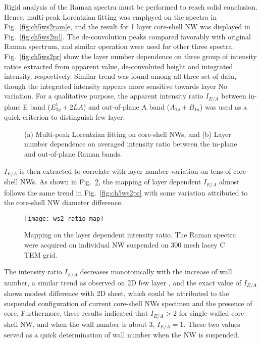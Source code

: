 Rigid analysis of the Raman spectra must be performed to reach solid conclusion. Hence, multi-peak Lorentzian fitting was emplpyed on the spectra in Fig.~\ref{fig:ch5ws2ram}e, and the result for 1 layer  core-shell NW was displayed in Fig.~\ref{fig:ch5ws2ml}. The de-convolution peaks compared favorably with original Raman spectrum, and similar operation were used for other three spectra. Fig.~\ref{fig:ch5ws2pr} show the layer number dependence on three group of intensity ratios extracted from apparent value, de-convoluted height and integrated intensity, respectively. Similar trend was found among all three set of data, though the integrated intensity appears more sensitive towards layer No variation. For a qualitative purpose, the apparent intensity ratio $I_{E/A}$ between in-plane E band ($E_{2g}^1+2LA$) and out-of-plane A band ($A_{1g}+B_{1u}$) was used as a quick criterion to distinguish  few layer. 
\begin{figure}[htb]
\centering
{}\hspace{0.04\textwidth}
\caption[Multi-peak Lorentzian fitting on core-shell NWs]{(a) Multi-peak Lorentzian fitting on core-shell NWs, and (b) Layer number dependence on averaged intensity ratio between the in-plane and out-of-plane Raman bands.}
\label{fig:ch5ws2prl}
\end{figure}

$I_{E/A}$ is then extracted to correlate with layer number variation on tens of core-shell NWs. As shown in Fig.~\ref{fig:ch5ws2ramap}, the mapping of  layer dependent $I_{E/A}$ almost follows the same trend in Fig.~\ref{fig:ch5ws2pr} with some variation attributed to the core-shell NW diameter difference.
\begin{figure}[htb]
\centering
\texttt{[image: ws2\_ratio\_map]}
\caption[Mapping on the  layer dependent intensity ratio]{Mapping on the  layer dependent intensity ratio. The Raman spectra were acquired on individual NW suspended on 300 mesh lacey C TEM grid.}
\label{fig:ch5ws2ramap}
\end{figure}
The intensity ratio $I_{E/A}$ decreases monotonically with the increase of  wall number, a similar trend as observed on 2D few layer ,\cite{Berkdemir2013} and the exact value of $I_{E/A}$ shows modest difference with 2D sheet, which could be attributed to the suspended configuration of current core-shell NWs specimen and the presence of  core. Furthermore, these results indicated that $I_{E/A} > 2$ for single-walled  core-shell NW, and when the  wall number is about 3, $I_{E/A}=1$. These two values served as a quick determination of  wall number when the NW is suspended. 


